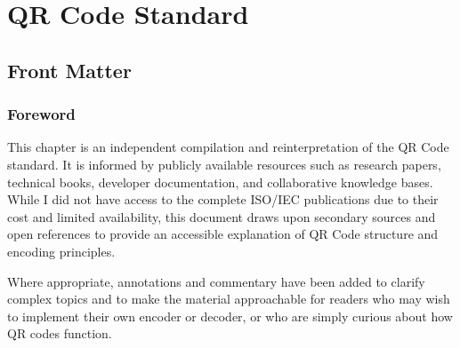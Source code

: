 \documentclass[../main]{subfiles}
\begin{document}
\chapter{QR Code Standard}

\section{Front Matter}

\subsection{Foreword}




This chapter is an independent compilation and reinterpretation of the QR Code standard. 
It is informed by publicly available resources such as research papers, technical books, developer documentation, and collaborative knowledge bases. 
While I did not have access to the complete ISO/IEC publications due to their cost and limited availability, this document draws upon secondary sources and open references to provide an accessible explanation of QR Code structure and encoding principles.  

Where appropriate, annotations and commentary have been added to clarify complex topics and to make the material approachable for readers who may wish to implement their own encoder or decoder, or who are simply curious about how QR codes function.  
\end{document}
